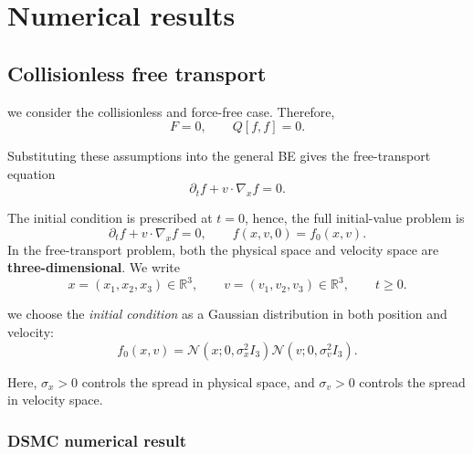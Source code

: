 \documentclass[11pt]{article}
\theoremstyle{plain}
\begin{document}
\section{Numerical results}
\label{sec:numerical_results}
\subsection{Collisionless free transport}

we consider the collisionless and force-free case. Therefore,
\begin{equation*}
F=0,
\qquad
Q[f,f]=0.
\end{equation*}

Substituting these assumptions into the general BE gives the free-transport equation
\begin{equation}
\boxed{
\partial_t f+v\cdot\nabla_x f=0.
}
\label{eq:free_transport}
\end{equation}

The initial condition is prescribed at $t=0$, hence, the full initial-value problem is
\begin{equation}
\boxed{
\partial_t f+v\cdot\nabla_x f=0,
\qquad
f(x,v,0)=f_0(x,v).
}
\label{eq:ivp_free_transport}
\end{equation}
In the free-transport problem, both the physical space and velocity space are \textbf{three-dimensional}. We write
\begin{equation*}
x=(x_1,x_2,x_3)\in \mathbb R^3,
\qquad
v=(v_1,v_2,v_3)\in \mathbb R^3,
\qquad
t\geq 0.
\end{equation*}

we choose the \textit{initial condition} as a Gaussian distribution in both position and velocity:
\begin{equation}
\boxed{
f_0(x,v)
=
\mathcal N(x;0,\sigma_x^2 I_3)
\mathcal N(v;0,\sigma_v^2 I_3).
}
\label{eq:gaussian_initial_condition}
\end{equation}

Here, $\sigma_x>0$ controls the spread in physical space, and $\sigma_v>0$ controls the spread in velocity space.

%



\subsubsection{DSMC numerical result}
\label{subsec:dsmc_result}
\end{document}

